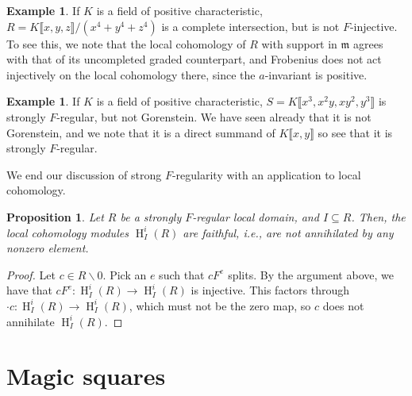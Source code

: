 \documentclass[11pt]{book}
\newtheorem{proposition}[theorem]{Proposition}
\numberwithin{equation}{section}
\numberwithin{theorem}{chapter}
\theoremstyle{definition}
\newtheorem{example}[theorem]{Example}
\newtheorem*{basic properties}{Basic Properties}
\newtheorem*{Important Remark}{Important Remark}
\theoremstyle{remark}
\newcommand{\m}{\mathfrak{m}}
\renewcommand{\H}{\operatorname{H}}
\begin{document}
\begin{example}
	If $K$ is a field of positive characteristic, $R=K\llbracket x,y,z \rrbracket/(x^4+y^4+z^4)$ is a complete intersection, but is not $F$-injective. To see this, we note that the local cohomology of $R$ with support in $\m$ agrees with that of its uncompleted graded counterpart, and Frobenius does not act injectively on the local cohomology there, since the $a$-invariant is positive.
\end{example}

\begin{example}
	If $K$ is a field of positive characteristic, $S=K\llbracket x^3, x^2 y, x y^2, y^3 \rrbracket$ is strongly $F$-regular, but not Gorenstein. We have seen already that it is not Gorenstein, and we note that it is a direct summand of $K\llbracket x,y \rrbracket$ so see that it is strongly $F$-regular.
\end{example}


We end our discussion of strong $F$-regularity with an application to local cohomology.

\begin{proposition}
	Let $R$ be a strongly $F$-regular local domain, and $I\subseteq R$. Then, the local cohomology modules $\H^i_I(R)$ are faithful, i.e., are not annihilated by any nonzero element.
\end{proposition}
\begin{proof}
Let $c\in R\smallsetminus 0$. Pick an $e$ such that $cF^e$ splits. By the argument above, we have that $cF^e: \H^i_I(R) \to \H^i_I(R)$ is injective. This factors through $\cdot c:\H^i_I(R) \to \H^i_I(R)$, which must not be the zero map, so $c$ does not annihilate $\H^i_I(R)$.
\end{proof}

\section{Magic squares}
\end{document}
